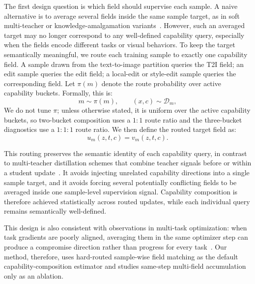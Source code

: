 The first design question is which field should supervise each sample. A naive alternative is to average several fields inside the same sample target, as in soft multi-teacher or knowledge-amalgamation variants~\cite{hinton2015distilling,shen2019customizing}. However, such an averaged target may no longer correspond to any well-defined capability query, especially when the fields encode different tasks or visual behaviors. To keep the target semantically meaningful, we route each training sample to exactly one capability field. A sample drawn from the text-to-image partition queries the T2I field; an edit sample queries the edit field; a local-edit or style-edit sample queries the corresponding field. Let $\pi(m)$ denote the route probability over active capability buckets. Formally, this is:
\begin{equation}
  m\sim \pi(m), \qquad (x,c)\sim \mathcal{D}_m,
  \label{eq:sample-route}
\end{equation}
We do not tune $\pi$; unless otherwise stated, it is uniform over the active capability buckets, so two-bucket composition uses a $1{:}1$ route ratio and the three-bucket diagnostics use a $1{:}1{:}1$ route ratio.
We then define the routed target field as:
\begin{equation}
  u_m(z,t,c)=v_m(z,t,c).
  \label{eq:routed-field}
\end{equation}

This routing preserves the semantic identity of each capability query, in contrast to multi-teacher distillation schemes that combine teacher signals before or within a student update~\cite{you2017learning,fukuda2017efficient}. It avoids injecting unrelated capability directions into a single sample target, and it avoids forcing several potentially conflicting fields to be averaged inside one sample-level supervision signal. Capability composition is therefore achieved statistically across routed updates, while each individual query remains semantically well-defined.

This design is also consistent with observations in multi-task optimization: when task gradients are poorly aligned, averaging them in the same optimizer step can produce a compromise direction rather than progress for every task~\cite{chen2018gradnorm,sener2018multi,yu2020gradient,liu2021conflict,javaloy2021rotograd}. Our method, therefore, uses hard-routed sample-wise field matching as the default capability-composition estimator and studies same-step multi-field accumulation only as an ablation.


